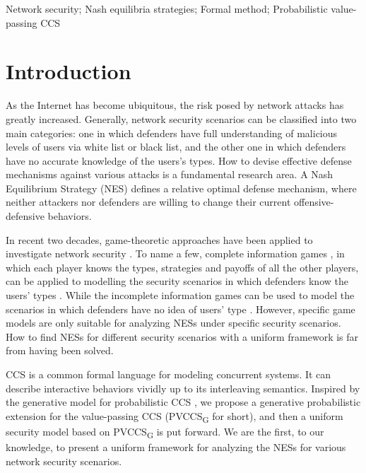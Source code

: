 \documentclass[10pt, conference, compsocconf]{IEEEtran}
\begin{document}
\begin{IEEEkeywords}
Network security; Nash equilibria strategies; Formal method; Probabilistic value-passing CCS

\end{IEEEkeywords}

\IEEEpeerreviewmaketitle

\section{Introduction}
As the Internet has become ubiquitous, the risk posed by network attacks has greatly increased. 
Generally, network security scenarios can be classified into two main categories: one in which defenders have full understanding of malicious levels of users via white list or black list, and the other one in which defenders have no accurate knowledge of the users's types.
How to devise effective defense mechanisms against various attacks is a fundamental research area.
A Nash Equilibrium Strategy (NES) \cite{david}\cite{rd} defines a relative optimal defense mechanism, where neither attackers nor defenders are willing to change their current offensive-defensive behaviors.

In recent two decades, game-theoretic approaches have been applied to investigate network security \cite{xiannuan}\cite{sankardas}\cite{syverson}.
To name a few, complete information games \cite{martin}, in which each player knows the types, strategies and payoffs of all the other players, can be applied to modelling the security scenarios in which defenders know the users' types \cite{nguyen}\cite{klye}\cite{ls}\cite{jean}\cite{xiaolin}.
While the incomplete information games can be used to model the scenarios in which defenders have no idea of users' type  \cite{Harsanyi}\cite{patcha}\cite{monireh}\cite{nguyen2}\cite{karel}\cite{chaozhang}.
However, specific game models are only suitable for analyzing NESs under specific security scenarios.
How to find NESs for different security scenarios with a uniform framework is far from having been solved.

CCS is a common formal language for modeling concurrent systems.
It can describe interactive behaviors vividly up to its interleaving semantics.
Inspired by the generative model for probabilistic CCS \cite{rob}, we propose a generative probabilistic extension for the value-passing CCS (PVCCS\textsubscript{G} for short), and then a uniform security model based on PVCCS\textsubscript{G} is put forward.
We are the first, to our knowledge, to present a uniform framework for analyzing the NESs for various network security scenarios.
\end{document}
